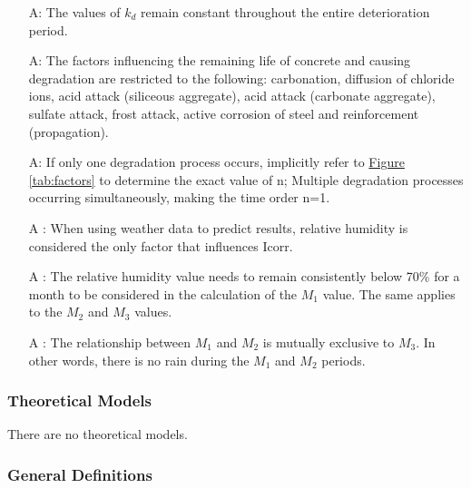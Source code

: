 \documentclass[12pt]{article}
\newcounter{assumpnum} %
\begin{document}
\begin{itemize}

\item[A\refstepcounter{assumpnum}\theassumpnum \label{kdconstant}:]
  The values of $k_d$ remain constant throughout the entire deterioration period.

\item[A\refstepcounter{assumpnum}\theassumpnum \label{factors}:]
  The factors influencing the remaining life of concrete and causing degradation are restricted to the following: carbonation, diffusion of chloride ions, acid attack (siliceous aggregate), acid attack (carbonate aggregate), sulfate attack, frost attack, active corrosion of steel and reinforcement (propagation).

\item[A\refstepcounter{assumpnum}\theassumpnum \label{kd}:]
    If only one degradation process occurs, implicitly refer to \hyperref[tab:factors]{Figure \ref{tab:factors}} to determine the exact value of n; Multiple degradation processes occurring simultaneously, making the time order n=1.

\item[A\refstepcounter{assumpnum}\theassumpnum 
\label{Rh}:]
When using weather data to predict results, relative humidity is considered the only factor that influences Icorr.

\item[A\refstepcounter{assumpnum}\theassumpnum 
\label{Months}:]
The relative humidity value needs to remain consistently below 70\% for a month to be considered in the calculation of the $M_1$ value. The same applies to the $M_2$ and $M_3$ values. 

\item[A\refstepcounter{assumpnum}\theassumpnum 
\label{Relationship}:]
The relationship between $M_1$ and $M_2$ is mutually exclusive to $M_3$. In other words, there is no rain during the $M_1$ and $M_2$ periods.

\end{itemize}

\subsubsection{Theoretical Models}\label{sec_theoretical}

There are no theoretical models.

\subsubsection{General Definitions}\label{sec_gendef}
\end{document}
